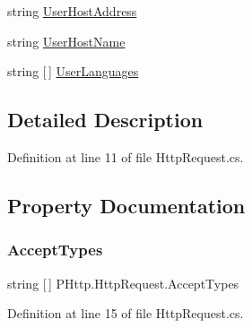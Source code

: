 \begin{DoxyCompactItemize}
string \hyperlink{class_p_http_1_1_http_request_a228ff39b81da12c66139228cd062cd75}{User\+Host\+Address}
\item 
string \hyperlink{class_p_http_1_1_http_request_a231930a81f9e4243c0c41cdb29b02800}{User\+Host\+Name}
\item 
string \mbox{[}$\,$\mbox{]} \hyperlink{class_p_http_1_1_http_request_af13741758a514767c4b4b4f980a92b55}{User\+Languages}
\end{DoxyCompactItemize}


\subsection{Detailed Description}


Definition at line 11 of file Http\+Request.\+cs.



\subsection{Property Documentation}
\mbox{\label{class_p_http_1_1_http_request_ab0c25acac17e02b4d528355619a1dbe8}} 
\subsubsection{\texorpdfstring{Accept\+Types}{AcceptTypes}}
{\footnotesize\ttfamily string \mbox{[}$\,$\mbox{]} P\+Http.\+Http\+Request.\+Accept\+Types\hspace{0.3cm}{\ttfamily [get]}}



Definition at line 15 of file Http\+Request.\+cs.

\mbox{\label{class_p_http_1_1_http_request_a6de8777f6a6f8549eaf9483e6db3a7aa}} 

